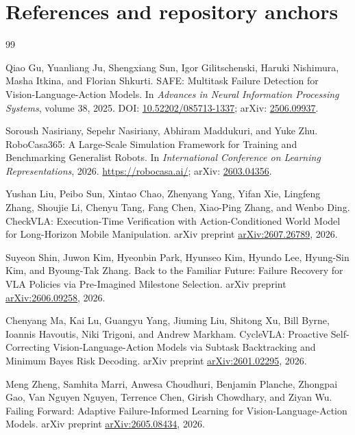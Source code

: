 \clearpage
\section{References and repository anchors}
\begingroup
\small

\begin{thebibliography}{99}

Qiao Gu, Yuanliang Ju, Shengxiang Sun, Igor Gilitschenski, Haruki Nishimura, Masha Itkina, and Florian Shkurti.
\newblock SAFE: Multitask Failure Detection for Vision-Language-Action Models.
\newblock In \emph{Advances in Neural Information Processing Systems}, volume 38, 2025.
\newblock DOI: \href{https://doi.org/10.52202/085713-1337}{10.52202/085713-1337}; arXiv: \href{https://arxiv.org/abs/2506.09937}{2506.09937}.

Soroush Nasiriany, Sepehr Nasiriany, Abhiram Maddukuri, and Yuke Zhu.
\newblock RoboCasa365: A Large-Scale Simulation Framework for Training and Benchmarking Generalist Robots.
\newblock In \emph{International Conference on Learning Representations}, 2026.
\newblock \url{https://robocasa.ai/}; arXiv: \href{https://arxiv.org/abs/2603.04356}{2603.04356}.

Yushan Liu, Peibo Sun, Xintao Chao, Zhenyang Yang, Yifan Xie, Lingfeng Zhang, Shoujie Li, Chenyu Tang, Fang Chen, Xiao-Ping Zhang, and Wenbo Ding.
\newblock CheckVLA: Execution-Time Verification with Action-Conditioned World Model for Long-Horizon Mobile Manipulation.
\newblock arXiv preprint \href{https://arxiv.org/abs/2607.26789}{arXiv:2607.26789}, 2026.

Suyeon Shin, Juwon Kim, Hyeonbin Park, Hyunseo Kim, Hyundo Lee, Hyung-Sin Kim, and Byoung-Tak Zhang.
\newblock Back to the Familiar Future: Failure Recovery for VLA Policies via Pre-Imagined Milestone Selection.
\newblock arXiv preprint \href{https://arxiv.org/abs/2606.09258}{arXiv:2606.09258}, 2026.

Chenyang Ma, Kai Lu, Guangyu Yang, Jiuming Liu, Shitong Xu, Bill Byrne, Ioannis Havoutis, Niki Trigoni, and Andrew Markham.
\newblock CycleVLA: Proactive Self-Correcting Vision-Language-Action Models via Subtask Backtracking and Minimum Bayes Risk Decoding.
\newblock arXiv preprint \href{https://arxiv.org/abs/2601.02295}{arXiv:2601.02295}, 2026.

Meng Zheng, Samhita Marri, Anwesa Choudhuri, Benjamin Planche, Zhongpai Gao, Van Nguyen Nguyen, Terrence Chen, Girish Chowdhary, and Ziyan Wu.
\newblock Failing Forward: Adaptive Failure-Informed Learning for Vision-Language-Action Models.
\newblock arXiv preprint \href{https://arxiv.org/abs/2605.08434}{arXiv:2605.08434}, 2026.


\end{thebibliography}

